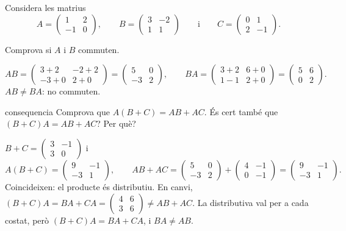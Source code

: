 Considera les matrius
\[
A=\begin{pmatrix}1&2\\-1&0\end{pmatrix},\qquad
B=\begin{pmatrix}3&-2\\1&1\end{pmatrix}\qquad\text{i}\qquad
C=\begin{pmatrix}0&1\\2&-1\end{pmatrix}.
\]

\begin{apartats}

Comprova si $A$ i $B$ commuten.

\begin{solucio}
\[
AB=\begin{pmatrix}3+2&-2+2\\-3+0&2+0\end{pmatrix}=\begin{pmatrix}5&0\\-3&2\end{pmatrix},\qquad
BA=\begin{pmatrix}3+2&6+0\\1-1&2+0\end{pmatrix}=\begin{pmatrix}5&6\\0&2\end{pmatrix}.
\]
$AB\ne BA$: no commuten.
\end{solucio}

\begin{tria}{consequencia}
Comprova que $A(B+C)=AB+AC$. És cert també que $(B+C)A=AB+AC$? Per què?

\begin{solucio}
$B+C=\begin{pmatrix}3&-1\\3&0\end{pmatrix}$ i
\[
A(B+C)=\begin{pmatrix}9&-1\\-3&1\end{pmatrix},\qquad
AB+AC=\begin{pmatrix}5&0\\-3&2\end{pmatrix}+\begin{pmatrix}4&-1\\0&-1\end{pmatrix}
=\begin{pmatrix}9&-1\\-3&1\end{pmatrix}.
\]
Coincideixen: el producte és distributiu. En canvi,
$(B+C)A=BA+CA=\begin{pmatrix}4&6\\3&6\end{pmatrix}\ne AB+AC$. La distributiva val per a cada costat,
però $(B+C)A=BA+CA$, i $BA\ne AB$.
\end{solucio}


\end{tria}
\end{apartats}
